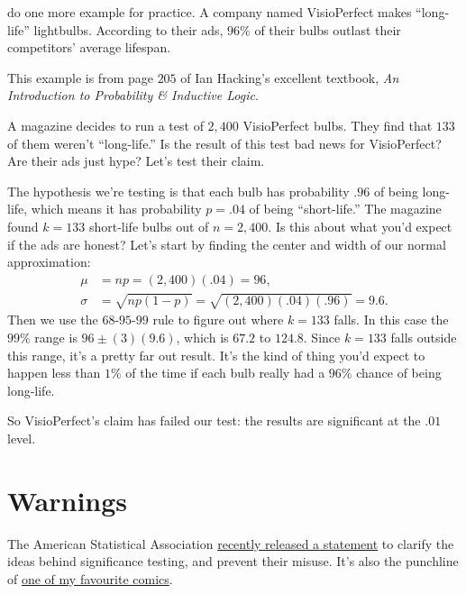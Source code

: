 \documentclass[justified]{tufte-book}
\theoremstyle{definition}
\theoremstyle{definition}
\theoremstyle{definition}
\theoremstyle{definition}
\theoremstyle{remark}
\begin{document}
 do one more example for practice. A company named VisioPerfect makes ``long-life'' lightbulbs. According to their ads, \(96\%\) of their bulbs outlast their competitors' average lifespan.

\begin{marginfigure}
This example is from page \(205\) of Ian Hacking's excellent textbook,
\emph{An Introduction to Probability \& Inductive Logic}.
\end{marginfigure}

A magazine decides to run a test of \(2,400\) VisioPerfect bulbs. They find that \(133\) of them weren't ``long-life.'' Is the result of this test bad news for VisioPerfect? Are their ads just hype? Let's test their claim.

The hypothesis we're testing is that each bulb has probability \(.96\) of being long-life, which means it has probability \(p = .04\) of being ``short-life.'' The magazine found \(k = 133\) short-life bulbs out of \(n = 2,400\). Is this about what you'd expect if the ads are honest? Let's start by finding the center and width of our normal approximation:
\[
  \begin{aligned}
    \mu &= np = (2,400)(.04) = 96,\\
    \sigma &= \sqrt{np(1-p)} = \sqrt{(2,400)(.04)(.96)} = 9.6.
  \end{aligned}
\]
Then we use the \(68\)-\(95\)-\(99\) rule to figure out where \(k = 133\) falls. In this case the \(99\%\) range is \(96 \pm (3)(9.6)\), which is \(67.2\) to \(124.8\). Since \(k = 133\) falls outside this range, it's a pretty far out result. It's the kind of thing you'd expect to happen less than \(1\%\) of the time if each bulb really had a \(96\%\) chance of being long-life.

So VisioPerfect's claim has failed our test: the results are significant at the \(.01\) level.

\hypertarget{warnings}{%
\section{Warnings}\label{warnings}}

\begin{marginfigure}
The American Statistical Association
\href{https://www.amstat.org/newsroom/pressreleases/P-ValueStatement.pdf}{recently
released a statement} to clarify the ideas behind significance testing,
and prevent their misuse. It's also the punchline of
\href{https://imgs.xkcd.com/comics/significant.png}{one of my favourite
comics}.
\end{marginfigure}
\end{document}
